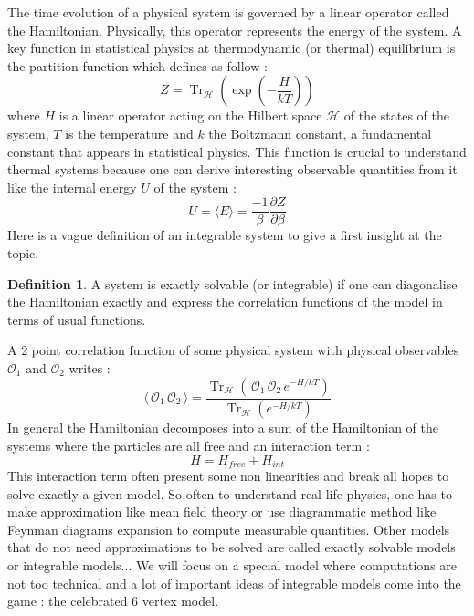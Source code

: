 \documentclass{article}
\DeclareMathOperator{\tr}{Tr}
\newcommand{\moy}[1]{\langle\,#1\,\rangle}
\theoremstyle{definition}
\newtheorem{Def}{Definition}[section]
\begin{document}
The time evolution of a physical system is governed by a linear operator called the Hamiltonian. Physically, this operator represents the energy of the system. A key function in statistical physics at thermodynamic (or thermal) equilibrium is the partition function which defines as follow : $$ Z=\tr_{\mathcal{H}}\left(\exp\left(-\frac{H}{kT}\right)\right)$$ where $H$ is a linear operator acting on the Hilbert space $\mathcal{H}$ of the states of the system, $T$ is the temperature and $k$ the Boltzmann constant, a fundamental constant that appears in statistical physics. This function is crucial to understand thermal systems because one can derive interesting observable quantities from it like the internal energy $U$ of the system : $$U=\langle E\rangle=\frac{-1}{\beta}\frac{\partial Z}{\partial\beta}$$
Here is a vague definition of an integrable system to give a first insight at the topic.
\begin{Def} A system is exactly solvable (or integrable) if one can diagonalise the Hamiltonian exactly and express the correlation functions of the model in terms of usual functions.
\end{Def} A 2 point correlation function of some physical system with physical observables  $\mathcal{O}_1$ and $\mathcal{O}_2 $  writes : 
$$\moy{\mathcal{O}_1\,\mathcal{O}_2} 
      = \frac{\tr_\mathcal{H} \left( \, \mathcal{O}_1\,\mathcal{O}_2 \, e^{-H /kT}\right)}
       {\tr_\mathcal{H} \left(e^{-H /kT}\right)}$$
In general the Hamiltonian decomposes into a sum of the Hamiltonian of the systems where the particles are all free and an interaction term :  $$H=H_{free}+H_{int}$$ This interaction term often present some non linearities and break all hopes to solve exactly a given model. So often to understand real life physics, one has to make approximation like mean field theory or use diagrammatic method like Feynman diagrams expansion to compute measurable quantities. Other models that do not need approximations to be solved are called exactly solvable models or integrable models... We will focus on a special model where computations are not too technical and a lot of important ideas of integrable models come into the game : the celebrated 6 vertex model.
\end{document}
